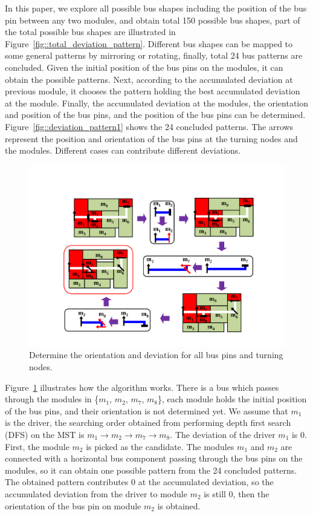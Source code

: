 In this paper, we explore all possible bus shapes including the position of the bus pin
between any two modules, and obtain total 150 possible bus shapes,
part of the total possible bus shapes are illustrated in Figure~\ref{fig::total_deviation_pattern}.
Different bus shapes can be mapped to some general patterns by mirroring or rotating,
finally, total 24 bus patterns are concluded. Given the initial position
of the bus pins on the modules, it can obtain the possible
patterns. Next, according to the accumulated deviation at previous
module, it chooses the pattern holding the best accumulated
deviation at the module. Finally, the accumulated deviation at the
modules, the orientation and position of the bus pins, and the position of the bus pins
can be determined. Figure~\ref{fig::deviation_pattern1} shows the
24 concluded patterns. The arrows represent the position and
orientation of the bus pins at the turning
nodes and the modules. Different cases can contribute different deviations.

\begin{figure}[htb]
  \centering
    \includegraphics[width=12cm]{Fig/deviation_example1.pdf}
     \caption{
      Determine the orientation and deviation for all bus pins and turning nodes.
   }
  \label{fig::deviation_example1}
\end{figure}

Figure~\ref{fig::deviation_example1} illustrates how the
algorithm works. There is a bus which passes through the modules in
\{$m_1$, $m_2$, $m_7$, $m_8$\}, each module holds the initial
position of the bus pins, and their orientation is not determined yet.
We assume that $m_1$ is the driver, the searching order obtained from
performing depth first search (DFS) on the MST is $m_1 \rightarrow m_2
\rightarrow m_7 \rightarrow m_8$. The deviation of the driver $m_1$ is 0.
First, the module $m_2$ is picked as the candidate.
The modules $m_1$ and $m_2$ are connected with
a horizontal bus component passing through the bus pins on the modules, so
it can obtain one possible pattern from the 24 concluded patterns.
The obtained pattern contributes 0 at the accumulated deviation, so the
accumulated deviation from the driver to module $m_2$ is still 0, then the
orientation of the bus pin on module $m_2$ is obtained.

